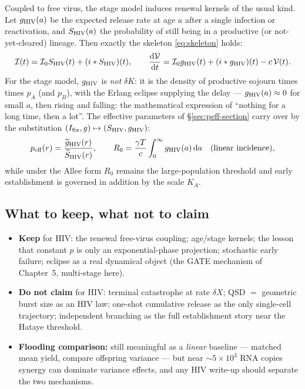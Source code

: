 Coupled to free virus, the stage model induces renewal kernels of the usual
kind. Let $g_{\rm HIV}(a)$ be the expected release rate at age $a$ after a
single infection or reactivation, and $S_{\rm HIV}(a)$ the probability of
still being in a productive (or not-yet-cleared) lineage. Then exactly the
skeleton \eqref{eq:skeleton} holds:
\begin{equation}
\mathcal{I}(t)=\mathcal{I}_0S_{\rm HIV}(t)+(i*S_{\rm HIV})(t),
\qquad
\displaystyle\frac{{\rm d} \mathcal{V}}{{\rm d} t}=\mathcal{I}_0g_{\rm HIV}(t)+(i*g_{\rm HIV})(t)-c\,\mathcal{V}(t).
\end{equation}
For the stage model, $g_{\rm HIV}$ is \emph{not} $\delta K$: it is the
density of productive sojourn times times $p_A$ (and $p_B$), with the
Erlang eclipse supplying the delay --- $g_{\rm HIV}(a)\approx0$ for small
$a$, then rising and falling: the mathematical expression of ``nothing for
a long time, then a lot''. The effective parameters of
\S\ref{sec:peff-section} carry over by the substitution
$(I_{\mathrm{fix}},g)\mapsto(S_{\rm HIV},g_{\rm HIV})$:
\begin{equation}
p_{\rm eff}(r)=\frac{\widetilde{g}_{\rm HIV}(r)}{\widetilde{S}_{\rm HIV}(r)},
\qquad
R_0=\frac{\gamma T}{c}\int_0^\infty g_{\rm HIV}(a)\,{\rm d} a
\quad\text{(linear incidence)},
\end{equation}
while under the Allee form $R_0$ remains the large-population threshold and
early establishment is governed in addition by the scale $K_A$.

\subsection{What to keep, what not to claim}

\begin{itemize}
\item \textbf{Keep} for HIV: the renewal free-virus coupling; age/stage
kernels; the lesson that constant $p$ is only an exponential-phase
projection; stochastic early failure; eclipse as a real dynamical object
(the GATE mechanism of Chapter~5, multi-stage here).
\item \textbf{Do not claim} for HIV: terminal catastrophe at rate
$\delta X$; QSD $=$ geometric burst size as an HIV law; one-shot
cumulative release as the only single-cell trajectory; independent
branching as the full establishment story near the Hataye threshold.
\item \textbf{Flooding comparison:} still meaningful as a \emph{linear}
baseline --- matched mean yield, compare offspring variance --- but near
$\sim5\times10^3$ RNA copies synergy can dominate variance effects, and any
HIV write-up should separate the two mechanisms.
\end{itemize}

